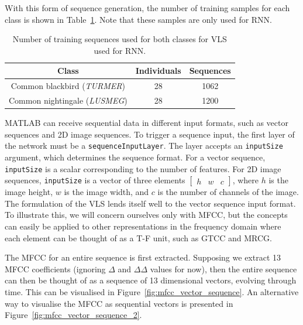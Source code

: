 With this form of sequence generation, the number of training samples for
each class is shown in Table~\ref{table:vls_training_samples}. Note that these
samples are only used for RNN\@.

\begin{table}[ht]
\begin{center}
\begin{tabular}{c c c}
\toprule
Class & Individuals & Sequences \\ [0.5ex]
\midrule
Common blackbird (\textit{TURMER}) & 28 & 1062 \\
Common nightingale (\textit{LUSMEG}) & 28 & 1200 \\
\bottomrule
\end{tabular}
\caption{Number of training sequences used for both
classes for VLS used for RNN.}\label{table:vls_training_samples}
\end{center}
\end{table}

MATLAB can receive sequential data in different input formats, such as vector
sequences and 2D image sequences. To trigger a sequence input, the first layer
of the network must be a \texttt{sequenceInputLayer}. The layer accepts an
\texttt{inputSize} argument, which determines the sequence format. For a vector
sequence, \texttt{inputSize} is a scalar corresponding to the number of
features. For 2D image sequences, \texttt{inputSize} is a vector of three
elements $\begin{bmatrix} h & w & c \end{bmatrix} $, where $h$ is the image
height, $w$ is the image width, and $c$ is the number of channels of the image.
The formulation of the VLS lends itself well to the vector sequence input
format. To illustrate this, we will concern ourselves only with MFCC, but the
concepts can easily be applied to other representations in the frequency domain
where each element can be thought of as a T-F unit, such as GTCC and MRCG\@.

The MFCC for an entire sequence is first extracted. Supposing we extract 13 MFCC
coefficients (ignoring $\Delta$ and $\Delta\Delta$ values for now), then the
entire sequence can then be thought of as a sequence of 13 dimensional vectors,
evolving through time. This can be visualised in
Figure~\ref{fig:mfcc_vector_sequence}. An alternative way to visualise the MFCC
as sequential vectors is presented in Figure~\ref{fig:mfcc_vector_sequence_2}.

